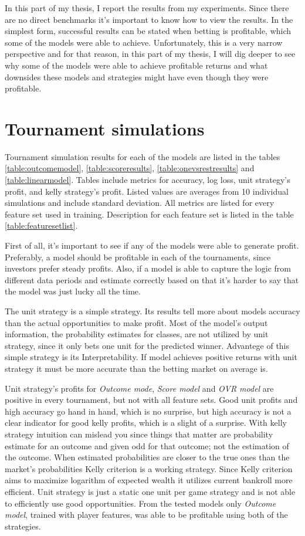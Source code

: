 In this part of my thesis, I report the results from my experiments. Since there are no direct benchmarks it's important to know how to view the results. In the simplest form, successful results can be stated when betting is profitable, which some of the models were able to achieve. Unfortunately, this is a very narrow perspective and for that reason, in this part of my thesis, I will dig deeper to see why some of the models were able to achieve profitable returns and what downsides these models and strategies might have even though they were profitable.

\section{Tournament simulations}
Tournament simulation results for each of the models are listed in the tables \ref{table:outcomemodel}, \ref{table:scoreresults}, \ref{table:onevsrestresults} and \ref{table:linearmodel}. Tables include metrics for accuracy, log loss, unit strategy's profit, and kelly strategy's profit. Listed values are averages from 10 individual simulations and include standard deviation. All metrics are listed for every feature set used in training. Description for each feature set is listed in the table \ref{table:featuresetlist}.

First of all, it's important to see if any of the models were able to generate profit. Preferably, a model should be profitable in each of the tournaments, since investors prefer steady profits. Also, if a model is able to capture the logic from different data periods and estimate correctly based on that it's harder to say that the model was just lucky all the time.

The unit strategy is a simple strategy. Its results tell more about models accuracy than the actual opportunities to make profit. Most of the model's output information, the probability estimates for classes, are not utilized by unit strategy, since it only bets one unit for the predicted winner. Advantege of this simple strategy is its Interpretability. If model achieves positive returns with unit strategy it must be more accurate than the betting market on average is.

Unit strategy's profits for \textit{Outcome mode}, \textit{Score model} and \textit{OVR model} are positive in every tournament, but not with all feature sets.  Good unit profits and high accuracy go hand in hand, which is no surprise, but high accuracy is not a clear indicator for good kelly profits, which is a slight of a surprise. With kelly strategy intuition can mislead you since things that matter are probability estimate for an outcome and given odd for that outcome; not the estimation of the outcome. When estimated probabilities are closer to the true ones than the market's probabilities Kelly criterion is a working strategy. Since Kelly criterion aims to maximize logarithm of expected wealth it utilizes current bankroll more efficient. Unit strategy is just a static one unit per game strategy and is not able to efficiently use good opportunities. From the tested models only \textit{Outcome model}, trained with player features, was able to be profitable using both of the strategies.


